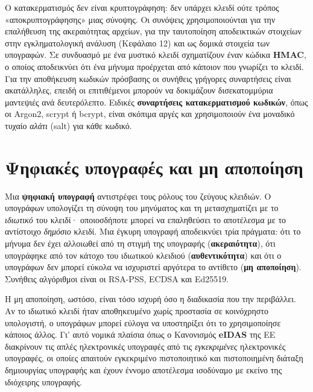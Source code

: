 Ο κατακερματισμός δεν είναι κρυπτογράφηση: δεν υπάρχει κλειδί ούτε τρόπος «αποκρυπτογράφησης» μιας σύνοψης. Οι συνόψεις χρησιμοποιούνται για την επαλήθευση της ακεραιότητας αρχείων, για την ταυτοποίηση αποδεικτικών στοιχείων στην εγκληματολογική ανάλυση (Κεφάλαιο 12) και ως δομικά στοιχεία των υπογραφών. Σε συνδυασμό με ένα μυστικό κλειδί σχηματίζουν έναν κώδικα \textbf{HMAC}, ο οποίος αποδεικνύει ότι ένα μήνυμα προέρχεται από κάποιον που γνωρίζει το κλειδί. Για την αποθήκευση κωδικών πρόσβασης οι συνήθεις γρήγορες συναρτήσεις είναι ακατάλληλες, επειδή οι επιτιθέμενοι μπορούν να δοκιμάζουν δισεκατομμύρια μαντεψιές ανά δευτερόλεπτο. Ειδικές \textbf{συναρτήσεις κατακερματισμού κωδικών}, όπως οι Argon2, scrypt ή bcrypt, είναι σκόπιμα αργές και χρησιμοποιούν ένα μοναδικό τυχαίο \emph{αλάτι} (salt) για κάθε κωδικό.

\section{Ψηφιακές υπογραφές και μη αποποίηση}\label{sec:7.3}
Μια \textbf{ψηφιακή υπογραφή} αντιστρέφει τους ρόλους του ζεύγους κλειδιών. Ο υπογράφων υπολογίζει τη σύνοψη του μηνύματος και τη μετασχηματίζει με το \emph{ιδιωτικό} του κλειδί· οποιοσδήποτε μπορεί να επαληθεύσει το αποτέλεσμα με το αντίστοιχο \emph{δημόσιο} κλειδί. Μια έγκυρη υπογραφή αποδεικνύει τρία πράγματα: ότι το μήνυμα δεν έχει αλλοιωθεί από τη στιγμή της υπογραφής (\textbf{ακεραιότητα}), ότι υπογράφηκε από τον κάτοχο του ιδιωτικού κλειδιού (\textbf{αυθεντικότητα}) και ότι ο υπογράφων δεν μπορεί εύκολα να ισχυριστεί αργότερα το αντίθετο (\textbf{μη αποποίηση}). Συνήθεις αλγόριθμοι είναι οι RSA-PSS, ECDSA και Ed25519.

Η μη αποποίηση, ωστόσο, είναι τόσο ισχυρή όσο η διαδικασία που την περιβάλλει. Αν το ιδιωτικό κλειδί ήταν αποθηκευμένο χωρίς προστασία σε κοινόχρηστο υπολογιστή, ο υπογράφων μπορεί εύλογα να υποστηρίξει ότι το χρησιμοποίησε κάποιος άλλος. Γι' αυτό νομικά πλαίσια όπως ο Κανονισμός \textbf{eIDAS} της ΕΕ διακρίνουν τις απλές ηλεκτρονικές υπογραφές από τις \emph{εγκεκριμένες} ηλεκτρονικές υπογραφές, οι οποίες απαιτούν εγκεκριμένο πιστοποιητικό και πιστοποιημένη διάταξη δημιουργίας υπογραφής και έχουν έννομο αποτέλεσμα ισοδύναμο με εκείνο της ιδιόχειρης υπογραφής.

